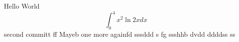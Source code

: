 \documentclass{article}
\begin{document}
Hello World
$$\int_0^4 x^2 \ln{2x}dx$$
second committ  ff
Mayeb
one more
againfd
sssddd 
s fg
ssshhb dvdd ddddss ss
\end{document}
